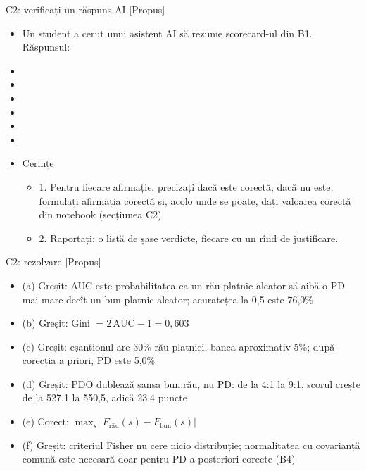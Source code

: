 \begin{frame}{C2: verificați un răspuns AI [Propus]}
\itemsize{\scriptsize}
\begin{itemize}
    \item Un student a cerut unui asistent AI să rezume scorecard-ul din B1. Răspunsul:
    \item {}
    \item {}
    \item {}
    \item {}
    \item {}
    \item {}
    \item Cerințe
    \begin{itemize}
        \item 1. Pentru fiecare afirmație, precizați dacă este corectă; dacă nu este, formulați afirmația corectă și, acolo unde se poate, dați valoarea corectă din notebook (secțiunea C2).
        \item 2. Raportați: o listă de șase verdicte, fiecare cu un rînd de justificare.
    \end{itemize}
\end{itemize}
\end{frame}

\ifsolutions
\begin{frame}{C2: rezolvare [Propus]}
\itemsize{\footnotesize}
\begin{itemize}
    \item (a) Greșit: AUC este probabilitatea ca un rău-platnic aleator să aibă o PD mai mare decît un bun-platnic aleator; acuratețea la 0,5 este 76{,}0\%
    \item (b) Greșit: Gini $= 2\,\mathrm{AUC} - 1 = 0{,}603$
    \item (c) Greșit: eșantionul are 30\% rău-platnici, banca aproximativ 5\%; după corecția a priori, PD este 5{,}0\%
    \item (d) Greșit: PDO dublează șansa bun:rău, nu PD: de la 4:1 la 9:1, scorul crește de la 527{,}1 la 550{,}5, adică 23{,}4 puncte
    \item (e) Corect: $\max_s|F_{\text{rău}}(s) - F_{\text{bun}}(s)|$
    \item (f) Greșit: criteriul Fisher nu cere nicio distribuție; normalitatea cu covarianță comună este necesară doar pentru PD a posteriori corecte (B4)
\end{itemize}
\end{frame}
\fi


